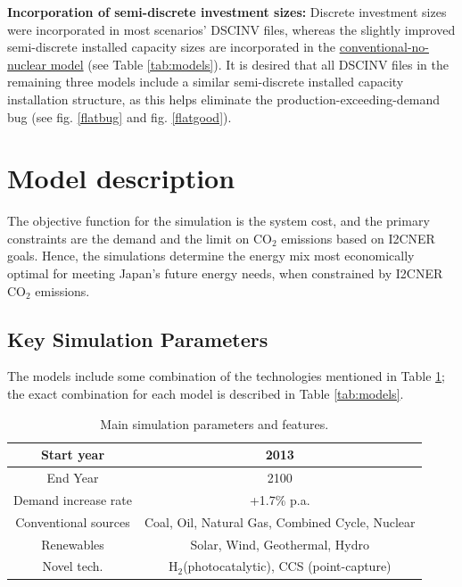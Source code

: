 \documentclass[14pt,a4paper]{article} %
\begin{document}
\textbf{Incorporation of semi-discrete investment sizes:} Discrete investment sizes were incorporated in most scenarios' \gls{DSCINV} files\cite{gargiulo_documentation_2005}, whereas the slightly improved semi-discrete installed  capacity sizes are incorporated in the \href{https://github.com/arfc/i2cner/tree/master/JPN-Main-Model/active/co2-constrnt-conv-nonuc}{conventional-no-nuclear model} (see Table \ref{tab:models}). It is desired that all \gls{DSCINV} files in the remaining three models include a similar semi-discrete installed  capacity installation structure, as this helps eliminate the production-exceeding-demand bug (see fig. \ref{flatbug} and fig. \ref{flatgood}).\\



\section{Model description}

The objective function \cite{loulou_documentation_2005} for the simulation is the system cost, and the primary constraints are the demand and the limit on CO$_2$ emissions based on \gls{I2CNER} goals. Hence, the simulations determine the energy mix most economically optimal for meeting Japan's future energy needs, when constrained by \gls{I2CNER} CO$_2$ emissions.

\subsection{Key Simulation Parameters}

The models include some combination of the technologies mentioned in Table \ref{tab:basic}; the exact combination for each model is described in Table \ref{tab:models}.

\begin{table}[H]
\centering
\caption{\label{tab:basic} Main simulation parameters and features.}
\begin{tabular}{|c|c|}
\hline
Start year & 2013 \\
\hline
End Year & 2100 \\
\hline
Demand increase rate & +1.7\% p.a. \cite{noauthor_electricity_2017} \\
\hline
Conventional sources & Coal, Oil, Natural Gas, Combined Cycle, Nuclear \\
\hline
Renewables & Solar, Wind, Geothermal, Hydro \\
\hline
Novel tech. & H$_2$(photocatalytic), \gls{CCS} (point-capture)\\
\hline
\end{tabular}
\end{table}
\end{document}
